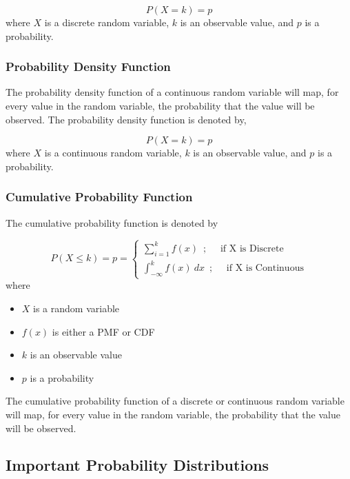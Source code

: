\documentclass{article}
\begin{document}
$$ P(X=k) = p $$\hfill \break
where $X$ is a discrete random variable, $k$ is an observable value, and $p$ is a probability.

\subsubsection{Probability Density Function}
The probability density function of a continuous random variable will map, for every value in the random variable, the probability that the value will be observed. The probability density function is denoted by,

$$ P(X=k) = p $$\hfill \break
where $X$ is a continuous random variable, $k$ is an observable value, and $p$ is a probability.

\hfill \break
\subsubsection{Cumulative Probability Function}

The cumulative probability function is denoted by

$$ P(X \leq k) = p = \begin{cases} \sum_{i=1}^{k} f(x) \enspace; \quad \text{ if X is Discrete} \\ \int_{-\infty}^{k} f(x) \: dx \enspace; \quad \text{ if X is Continuous}  \end{cases} $$\hfill \break
where 
\begin{itemize}
    \item $X$ is a random variable
    \item $f(x)$ is either a PMF or CDF
    \item $k$ is an observable value
    \item $p$ is a probability
\end{itemize}
The cumulative probability function of a discrete or continuous random variable will map, for every value in the random variable, the probability that the value will be observed. 

\newpage
\subsection{Important Probability Distributions}
\end{document}
